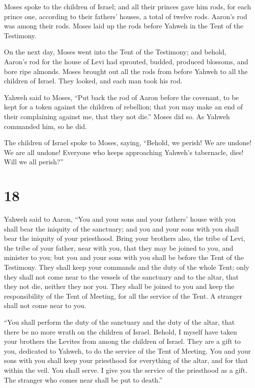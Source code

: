  Moses spoke to the children of Israel; and all their
princes gave him rods, for each prince one, according to their fathers'
houses, a total of twelve rods. Aaron's rod was among their rods.
 Moses laid up the rods before Yahweh in the Tent of the
Testimony.

 On the next day, Moses went into the Tent of the Testimony;
and behold, Aaron's rod for the house of Levi had sprouted, budded,
produced blossoms, and bore ripe almonds.  Moses brought out
all the rods from before Yahweh to all the children of Israel. They
looked, and each man took his rod.

 Yahweh said to Moses, ``Put back the rod of Aaron before
the covenant, to be kept for a token against the children of rebellion;
that you may make an end of their complaining against me, that they not
die.''  Moses did so. As Yahweh commanded him, so he did.

 The children of Israel spoke to Moses, saying, ``Behold,
we perish! We are undone! We are all undone!  Everyone who
keeps approaching Yahweh's tabernacle, dies! Will we all perish?''

\hypertarget{section-17}{%
\section{18}\label{section-17}}

 Yahweh said to Aaron, ``You and your sons and your fathers'
house with you shall bear the iniquity of the sanctuary; and you and
your sons with you shall bear the iniquity of your priesthood.
 Bring your brothers also, the tribe of Levi, the tribe of
your father, near with you, that they may be joined to you, and minister
to you; but you and your sons with you shall be before the Tent of the
Testimony.  They shall keep your commands and the duty of
the whole Tent; only they shall not come near to the vessels of the
sanctuary and to the altar, that they not die, neither they nor you.
 They shall be joined to you and keep the responsibility of
the Tent of Meeting, for all the service of the Tent. A stranger shall
not come near to you.

 ``You shall perform the duty of the sanctuary and the duty
of the altar, that there be no more wrath on the children of Israel.
 Behold, I myself have taken your brothers the Levites from
among the children of Israel. They are a gift to you, dedicated to
Yahweh, to do the service of the Tent of Meeting.  You and
your sons with you shall keep your priesthood for everything of the
altar, and for that within the veil. You shall serve. I give you the
service of the priesthood as a gift. The stranger who comes near shall
be put to death.''

